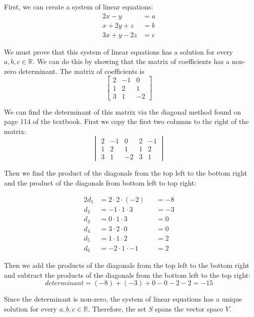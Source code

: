 	First, we can create a system of linear equations:
	\begin{align*}
		2x - y      & = a \\
		x + 2y + z  & = b \\
		3x + y - 2z & = c
	\end{align*}

	We must prove that this system of linear equations has a solution for every $a,b,c\in\mathbb{R}$. We can do this by showing that the matrix of coefficients has a non-zero determinant. The matrix of coefficients is
$$
\begin{bmatrix}
	2 & -1 & 0  \\
	1 & 2  & 1  \\
	3 & 1  & -2
\end{bmatrix}
$$

	We can find the determinant of this matrix via the diagonal method found on page 114 of the textbook. First we copy the first two columns to the right of the matrix:
$$
\begin{vmatrix}
	2 & -1 & 0  & 2 & -1 \\
	1 & 2  & 1  & 1 & 2  \\
	3 & 1  & -2 & 3 & 1
\end{vmatrix}
$$

	Then we find the product of the diagonals from the top left to the bottom right and the product of the diagonals from bottom left to top right:

	\begin{alignat*}{2}
		d_1 & = 2\cdot2\cdot(-2) &  & = -8 \\
		d_2 & = -1\cdot1\cdot3   &  & = -3 \\
		d_3 & = 0\cdot1\cdot3    &  & = 0  \\
		d_4 & = 3\cdot2\cdot0    &  & = 0  \\
		d_5 & = 1\cdot1\cdot2    &  & = 2  \\
		d_6 & = -2\cdot1\cdot-1  &  & = 2
	\end{alignat*}

	Then we add the products of the diagonals from the top left to the bottom right and subtract the products of the diagonals from the bottom left to the top right:
$$
determinant = (-8) + (-3) + 0 - 0 - 2 - 2 = -15
$$

Since the determinant is non-zero, the system of linear equations has a unique solution for every $a,b,c\in\mathbb{R}$. Therefore, the set $S$ spans the vector space $V$.

